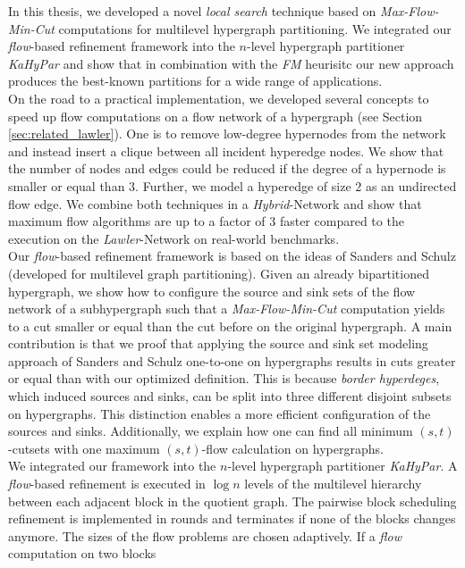 In this thesis, we developed a novel \emph{local search} technique based on \emph{Max-Flow-Min-Cut}
computations for multilevel hypergraph partitioning. We integrated our \emph{flow}-based
refinement framework into the $n$-level hypergraph partitioner \emph{KaHyPar} and show that
in combination with the \emph{FM} heurisitc our new approach produces the best-known partitions
for a wide range of applications.\\
On the road to a practical implementation, we developed several concepts to speed up flow
computations on a flow network of a hypergraph (see Section \ref{sec:related_lawler}).
One is to remove low-degree hypernodes from the network and instead insert a clique 
between all incident hyperedge nodes. We show that the number of nodes and edges could
be reduced if the degree of a hypernode is smaller or equal than $3$. Further, we model a hyperedge
of size $2$ as an undirected flow edge. We combine both techniques in a \emph{Hybrid}-Network 
and show that maximum flow algorithms are up to a factor of $3$ faster compared to
the execution on the \emph{Lawler}-Network \cite{lawler1973} on real-world benchmarks. \\
Our \emph{flow}-based refinement framework is based on the ideas of Sanders and Schulz
\cite{sanders2011engineering} (developed for multilevel graph partitioning). Given an already bipartitioned
hypergraph, we show how to configure the source and sink sets of the flow network 
of a subhypergraph such that a \emph{Max-Flow-Min-Cut} computation yields to a cut smaller 
or equal than the cut before on the original hypergraph. A main contribution is that we proof
that applying the source and sink set modeling approach of Sanders and Schulz one-to-one on 
hypergraphs results in cuts greater or equal than with our optimized definition. This is because 
\emph{border hyperdeges}, which induced sources and sinks, can be
split into three different disjoint subsets on hypergraphs. This distinction enables a more efficient
configuration of the sources and sinks. Additionally, we explain how one can find all 
minimum $(s,t)$-cutsets with one maximum $(s,t)$-flow calculation on hypergraphs. \\
We integrated our framework into the $n$-level hypergraph partitioner
\emph{KaHyPar}. A \emph{flow}-based refinement is executed in $\log{n}$ levels of the multilevel
hierarchy between each adjacent block in the quotient graph. The pairwise block scheduling 
refinement is implemented in rounds and terminates if none of the blocks changes anymore.
The sizes of the flow problems are chosen adaptively. If a \emph{flow} computation on two blocks
